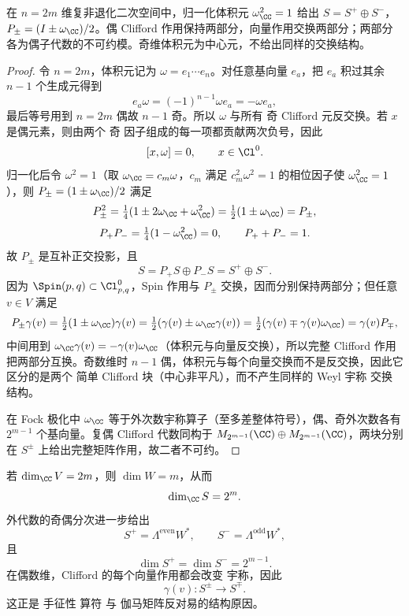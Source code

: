\begin{proposition}[偶维旋量的手征分解]
在 $n=2m$ 维复非退化二次空间中，归一化体积元 $\omega_\CC^2=1$ 给出 $S=S^+\oplus S^-$，$P_\pm=(I\pm\omega_\CC)/2$。偶 Clifford 作用保持两部分，向量作用交换两部分；两部分各为偶子代数的不可约模。奇维体积元为中心元，不给出同样的交换结构。
\end{proposition}
\begin{proof}
令 $n=2m$，体积元记为 $\omega=e_1\cdots e_n$。对任意基向量 $e_a$，把 $e_a$ 积过其余 $n-1$ 个生成元得到
\[
e_a\omega=(-1)^{n-1}\omega e_a=-\omega e_a,
\]
最后等号用到 $n=2m$ 偶故 $n-1$ 奇。所以 $\omega$ 与所有 奇 Clifford 元反交换。若 $x$ 是偶元素，则由两个 奇 因子组成的每一项都贡献两次负号，因此
\[
[x,\omega]=0,
\qquad x\in\Cl^0.
\]
归一化后令 $\omega^2=1$（取 $\omega_\CC=c_m\omega$，$c_m$ 满足 $c_m^2\omega^2=1$ 的相位因子使 $\omega_\CC^2=1$），则 $P_\pm=(1\pm\omega_\CC)/2$ 满足
\[
P_\pm^2=\tfrac14(1\pm2\omega_\CC+\omega_\CC^2)=\tfrac12(1\pm\omega_\CC)=P_\pm,
\]
\[
P_+P_-=\tfrac14(1-\omega_\CC^2)=0,
\qquad
P_++P_-=1.
\]
故 $P_\pm$ 是互补正交投影，且
\[
S=P_+S\oplus P_-S=S^+\oplus S^-.
\]
因为 $\Spin(p,q)\subset\Cl_{p,q}^0$，Spin 作用与 $P_\pm$ 交换，因而分别保持两部分；但任意 $v\in V$ 满足
\[
P_\pm\gamma(v)=\tfrac12(1\pm\omega_\CC)\gamma(v)
=\tfrac12(\gamma(v)\pm\omega_\CC\gamma(v))
=\tfrac12(\gamma(v)\mp\gamma(v)\omega_\CC)
=\gamma(v)P_\mp,
\]
中间用到 $\omega_\CC\gamma(v)=-\gamma(v)\omega_\CC$（体积元与向量反交换），所以完整 Clifford 作用把两部分互换。奇数维时 $n-1$ 偶，体积元与每个向量交换而不是反交换，因此它区分的是两个 简单 Clifford 块（中心非平凡），而不产生同样的 Weyl 宇称 交换结构。

在 Fock 极化中 $\omega_\CC$ 等于外次数宇称算子（至多差整体符号），偶、奇外次数各有 $2^{m-1}$ 个基向量。复偶 Clifford 代数同构于 $M_{2^{m-1}}(\CC)\oplus M_{2^{m-1}}(\CC)$，两块分别在 $S^\pm$ 上给出完整矩阵作用，故二者不可约。
\end{proof}


若 $\dim_{\CC}V=2m$，则 $\dim W=m$，从而
\[
\dim_{\CC}S=2^m.
\]
外代数的奇偶分次进一步给出
\begin{equation}
S^+=\Lambda^{\mathrm{even}}W^*,
\qquad
S^-=\Lambda^{\mathrm{odd}}W^*,
\label{eq:spinor-fock-chirality}
\end{equation}
且
\[
\dim S^+=\dim S^-=2^{m-1}.
\]
在偶数维，Clifford 的每个向量作用都会改变 宇称，因此
\[
\gamma(v):S^\pm\to S^\mp.
\]
这正是 手征性 算符 与 伽马矩阵反对易的结构原因。

